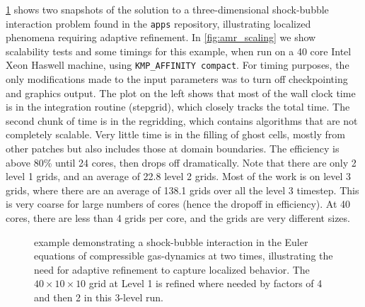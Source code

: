 \cref{fig:shockbubble} shows two snapshots of the solution to a
three-dimensional shock-bubble
interaction problem found in the \clawpack \texttt{apps} repository,
illustrating localized phenomena requiring adaptive refinement.
In \cref{fig:amr_scaling} we show scalability tests and some timings for
this example, when run on a 40 core Intel Xeon Haswell machine, using
\texttt{KMP\_AFFINITY compact}.
For timing purposes, the only modifications made to the input parameters was to turn
off checkpointing and graphics output.
The plot on the left shows that most of the wall clock time is in the integration
routine (stepgrid), which closely tracks the total time.
The second chunk of time is in the regridding, which contains algorithms that are not
completely scalable. Very little time is in the filling of ghost cells, mostly from
other patches but also includes those at domain boundaries.
The efficiency is above 80\% until 24 cores, then drops off dramatically.
Note that there are only 2 level 1 grids, and an average of 22.8 level 2 grids. Most of
the work is on level 3 grids, where there are an average of 138.1 grids over all the
level 3 timestep.  This is very coarse
for large numbers of cores (hence the dropoff in efficiency). At 40 cores, there are
less than 4 grids per core, and the grids are very different sizes.

\begin{figure}[t]
  \begin{center}
    \hfil
  \end{center}
\caption{\amrclaw example demonstrating a
  shock-bubble interaction in the Euler equations of compressible
  gas-dynamics at two times, illustrating the need for adaptive refinement
  to capture localized behavior. The
  $40\times 10\times 10$ grid at Level 1 is refined where needed
  by factors of 4 and then 2 in this 3-level run.}
\label{fig:shockbubble}
\end{figure}

